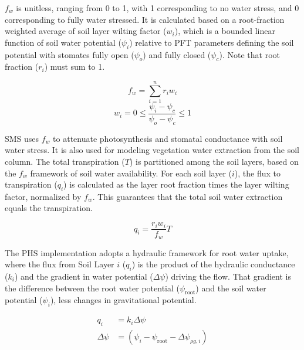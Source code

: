 \documentclass[draft,linenumbers]{agujournal}
\begin{document}
    $f_w$ is unitless, ranging from 0 to 1, with 1 corresponding to no water stress, and 0 corresponding to fully water stressed. 
    It is calculated based on a root-fraction weighted average of soil layer wilting factor ($w_i$), which is a bounded linear 
    function of soil water potential ($\psi_i$) relative to PFT parameters defining the soil potential with stomates fully open ($
    \psi_{o}$) and fully closed ($\psi_{c}$). Note that root fraction ($r_i$) must sum to 1.
    
    \begin{linenomath*}
    \begin{equation} f_w = \sum_{i=1}^{n}{r_iw_i}
    \label{bt:1}
    \end{equation}
    \begin{equation} 
    \label{bt:2}
    w_i=0 \leq \dfrac{\psi_i-\psi_{c}}{\psi_{o}-\psi_{c}} \leq 1
    \end{equation}
    \end{linenomath*}
    
    SMS uses $f_w$ to attenuate photosynthesis and stomatal conductance with soil water stress. 
    It is also used for modeling vegetation water extraction from the soil column. 
    The total transpiration ($T$) is partitioned among the soil layers, based on the $f_w$ framework of soil water availability. 
    For each soil layer ($i$), the flux to transpiration ($q_i$) is calculated as the layer root fraction times the layer wilting factor, normalized by $f_w$. 
    This guarantees that the total soil water extraction equals the transpiration.
    \begin{linenomath*}
    \begin{equation}
    \label{bt:4}
    q_i = \dfrac{r_i w_i}{f_w}T
    \end{equation}
    \end{linenomath*}
    
    The PHS implementation adopts a hydraulic framework for root water uptake, where the flux from Soil Layer $i$ ($q_i$) is 
    the product of the hydraulic conductance ($k_i$) and the gradient in water potential ($\Delta\psi$) driving the flow.
    That gradient is the difference between the root water potential ($\psi_{\text{root}}$) and the soil water potential ($\psi_i$), less changes in gravitational potential.
    \begin{linenomath*}
    \begin{equation}
        \begin{aligned}
    q_i &= k_i \Delta\psi \\
    \Delta\psi &= \left(\psi_{i}-\psi_{\text{root}}-\Delta\psi_{\rho g,i} \right)
    \label{phs:sink}
    \end{aligned}
    \end{equation}
    \end{linenomath*}
    
\end{document}
